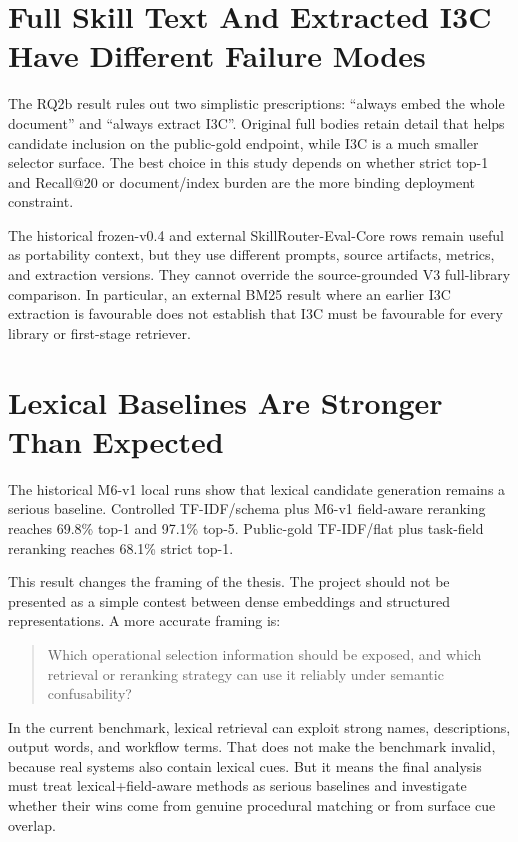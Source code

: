 \section{Full Skill Text And Extracted I3C Have Different Failure Modes}

The RQ2b result rules out two simplistic prescriptions: ``always embed the whole document'' and ``always extract I3C''. Original full bodies retain detail that helps candidate inclusion on the public-gold endpoint, while I3C is a much smaller selector surface. The best choice in this study depends on whether strict top-1 and Recall@20 or document/index burden are the more binding deployment constraint.

The historical frozen-v0.4 and external SkillRouter-Eval-Core rows remain useful as portability context, but they use different prompts, source artifacts, metrics, and extraction versions. They cannot override the source-grounded V3 full-library comparison. In particular, an external BM25 result where an earlier I3C extraction is favourable does not establish that I3C must be favourable for every library or first-stage retriever.

\section{Lexical Baselines Are Stronger Than Expected}

The historical M6-v1 local runs show that lexical candidate generation remains a serious baseline. Controlled TF-IDF/schema plus M6-v1 field-aware reranking reaches 69.8\% top-1 and 97.1\% top-5. Public-gold TF-IDF/flat plus task-field reranking reaches 68.1\% strict top-1.

This result changes the framing of the thesis. The project should not be presented as a simple contest between dense embeddings and structured representations. A more accurate framing is:

\begin{quote}
Which operational selection information should be exposed, and which retrieval or reranking strategy can use it reliably under semantic confusability?
\end{quote}

In the current benchmark, lexical retrieval can exploit strong names, descriptions, output words, and workflow terms. That does not make the benchmark invalid, because real systems also contain lexical cues. But it means the final analysis must treat lexical+field-aware methods as serious baselines and investigate whether their wins come from genuine procedural matching or from surface cue overlap.

